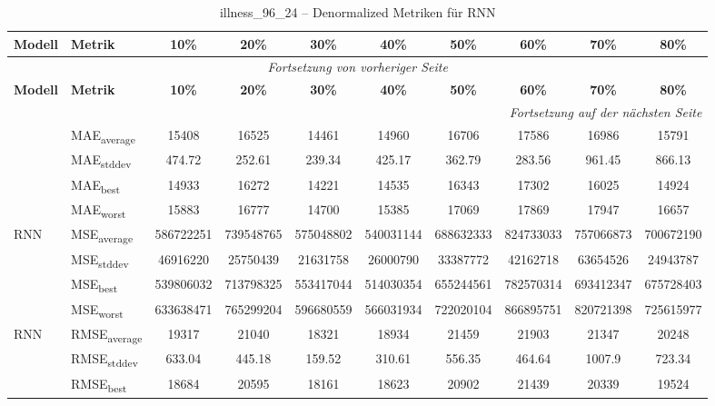 {\small
\begin{longtable}{l l c c c c c c c c}
    \toprule
    \textbf{Modell} & \textbf{Metrik} & \textbf{10\%} & \textbf{20\%} & \textbf{30\%} & \textbf{40\%} & \textbf{50\%} & \textbf{60\%} & \textbf{70\%} & \textbf{80\%} \\
    \midrule
    \endfirsthead
    \multicolumn{10}{c}{\textit{Fortsetzung von vorheriger Seite}} \\
    \toprule
    \textbf{Modell} & \textbf{Metrik} & \textbf{10\%} & \textbf{20\%} & \textbf{30\%} & \textbf{40\%} & \textbf{50\%} & \textbf{60\%} & \textbf{70\%} & \textbf{80\%} \\
    \midrule
    \endhead
    \midrule
    \multicolumn{10}{r}{\textit{Fortsetzung auf der nächsten Seite}} \\
    \midrule
    \endfoot
    \bottomrule
    \caption{illness_96_24 -- Denormalized Metriken für RNN}
    \label{tab:illness_96_24_denormalized_rnn}
    \endlastfoot
\multirow{4}{*}{RNN} & MAE\textsubscript{average} & 15408 & 16525 & 14461 & 14960 & 16706 & 17586 & 16986 & 15791 \\
 & MAE\textsubscript{stddev} & 474.72 & 252.61 & 239.34 & 425.17 & 362.79 & 283.56 & 961.45 & 866.13 \\
 & MAE\textsubscript{best} & 14933 & 16272 & 14221 & 14535 & 16343 & 17302 & 16025 & 14924 \\
 & MAE\textsubscript{worst} & 15883 & 16777 & 14700 & 15385 & 17069 & 17869 & 17947 & 16657 \\
\cmidrule(lr){2-10}
\multirow{4}{*}{RNN} & MSE\textsubscript{average} & 586722251 & 739548765 & 575048802 & 540031144 & 688632333 & 824733033 & 757066873 & 700672190 \\
 & MSE\textsubscript{stddev} & 46916220 & 25750439 & 21631758 & 26000790 & 33387772 & 42162718 & 63654526 & 24943787 \\
 & MSE\textsubscript{best} & 539806032 & 713798325 & 553417044 & 514030354 & 655244561 & 782570314 & 693412347 & 675728403 \\
 & MSE\textsubscript{worst} & 633638471 & 765299204 & 596680559 & 566031934 & 722020104 & 866895751 & 820721398 & 725615977 \\
\cmidrule(lr){2-10}
\multirow{4}{*}{RNN} & RMSE\textsubscript{average} & 19317 & 21040 & 18321 & 18934 & 21459 & 21903 & 21347 & 20248 \\
 & RMSE\textsubscript{stddev} & 633.04 & 445.18 & 159.52 & 310.61 & 556.35 & 464.64 & 1007.9 & 723.34 \\
 & RMSE\textsubscript{best} & 18684 & 20595 & 18161 & 18623 & 20902 & 21439 & 20339 & 19524 \\

\end{longtable}}
